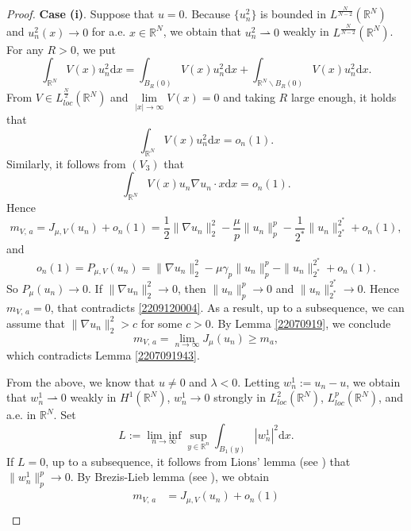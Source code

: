 \documentclass[10pt]{article}
\numberwithin{equation}{section}
\newcommand{\ud}{\mathrm{d}}
\numberwithin{equation}{section}
\begin{document}
\begin{proof}
\medskip\noindent
{\bf Case (i)}. Suppose that $u=0$. Because $\{u^2_n\}$ is bounded in $L^{\frac{N}{N-2}}(\mathbb{R}^N)$ and $u^2_n(x)\rightarrow 0$ for a.e. $x\in \mathbb{R}^N$, we obtain that $u^2_n\rightharpoonup 0$ weakly in $L^{\frac{N}{N-2}}(\mathbb{R}^N)$. For any $R>0$, we put
 \begin{equation}
\int_{\mathbb{R}^N}V(x)u_n^2 \ud x =\int_{B_R(0)}V(x)u_n^2 \ud x + \int_{\mathbb{R}^N\backslash B_R(0)}V(x)u_n^2 \ud x.
\end{equation}
From $V\in L^{\frac{N}{2}}_{loc}(\mathbb{R}^N)$ and $\lim\limits_{|x|\rightarrow\infty} V(x)=0$ and taking $R$ large enough, it holds that
\begin{equation}\label{2307022355}
\int_{\mathbb{R}^N}V(x)u_n^2 \ud x=o_n(1).
\end{equation}
Similarly, it follows from $(V_3)$ that
\begin{equation}\label{2302032102}
\int_{\mathbb{R}^N}V(x)u_n\nabla u_n\cdot x \ud x=o_n(1).
\end{equation}
Hence
$${m}_{V,\, a}=J_{\mu, V}(u_n)+o_n(1)=\frac12 \|\nabla u_n\|_2^2-\frac{\mu}{p}\|u_n\|_p^p-\frac{1}{2^*}\|u_n\|_{2^*}^{2^*}+o_n(1),$$
and
\begin{equation}\label{23020321}
o_n(1)=P_{\mu, V}(u_n)=\|\nabla u_n\|_2^2-\mu\gamma_p\|u_n\|_p^p-\|u_n\|_{2^*}^{2^*}+o_n(1).
\end{equation}
So $P_{\mu}(u_n)\rightarrow 0$. If $\|\nabla u_n\|_2^2\to 0$, then $\|u_n\|_p^p\to 0$ and $\|u_n\|_{2^*}^{2^*}\to 0$. Hence ${m}_{V,\, a}=0$, that contradicts \eqref{2209120004}. As a result, up to a subsequence, we can assume that $\|\nabla u_n\|_2^2>c$ for some $c>0$.
 By Lemma \ref{22070919}, we conclude
$${m}_{V,\, a}=\underset{n\rightarrow \infty}{\lim}J_{\mu}(u_n)\ge m_a,$$
which contradicts Lemma \ref{2207091943}.\par
From the above, we know that $u\neq 0$ and $\lambda<0$. Letting $w^1_n:=u_n-u$, we obtain that $w^1_n\rightharpoonup 0$ weakly in $H^1(\mathbb{R}^N)$, $w^1_n\rightarrow 0$ strongly in $L^2_{loc}(\mathbb{R}^N)$, $L^p_{loc}(\mathbb{R}^N)$, and a.e. in $\mathbb{R}^N$. Set
\[
L:=\underset{n\rightarrow\infty}{\lim\inf}\underset{y\in \mathbb{R}^n}{\sup}\int_{B_1(y)}|w^1_n|^2 \ud x.
\]
If $L=0$, up to a subsequence, it follows from Lions' lemma (see \cite[Theorem 1.34]{Willem96}) that $\|w_n^1\|_p^p\rightarrow 0$. By Brezis-Lieb lemma (see \cite[Lemma 1.32]{Willem96}), we obtain
\[
\begin{aligned}
{m}_{V,\, a} &=J_{\mu, V}(u_n)+o_n(1)\\

\end{aligned}\]
\end{proof}
\end{document}

